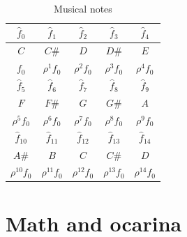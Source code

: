 \documentclass[11pt,twocolumn]{article}
\begin{document}
\begin{table}[h]
\center
{\renewcommand{\arraystretch}{1.2}
\begin{tabular}{|c|c|c|c|c|}
\hline
$\hat{f}_{0}$ & $\hat{f}_{1}$    & $\hat{f}_{2}$    & $\hat{f}_{3}$    & $\hat{f}_{4}$    \\ \hline
$C$           & $C\#$            & $D$              & $D\#$            & $E$              \\ \hline
$f_{0}$       & ${\rho}^1 f_{0}$ & ${\rho}^2 f_{0}$ & ${\rho}^3 f_{0}$ & ${\rho}^4 f_{0}$ \\ \hline
\hline
$\hat{f}_{5}$    & $\hat{f}_{6}$    & $\hat{f}_{7}$    & $\hat{f}_{8}$    & $\hat{f}_{9}$    \\ \hline
$F$              & $F\#$            & $G$              & $G\#$            & $A$              \\ \hline
${\rho}^5 f_{0}$ & ${\rho}^6 f_{0}$ & ${\rho}^7 f_{0}$ & ${\rho}^8 f_{0}$ & ${\rho}^9 f_{0}$ \\ \hline
\hline 
$\hat{f}_{10}$      & $\hat{f}_{11}$      & $\hat{f}_{12}$      & $\hat{f}_{13}$      & $\hat{f}_{14}$      \\ \hline
$A\#$               & $B$                 & $C$                 & $C\#$               & $D$                 \\ \hline
${\rho}^{10} f_{0}$ & ${\rho}^{11} f_{0}$ & ${\rho}^{12} f_{0}$ & ${\rho}^{13} f_{0}$ & ${\rho}^{14} f_{0}$ \\ \hline
\end{tabular}
}
\vspace{5pt}
\caption{Musical notes}
\label{tab:notes}
\end{table}


\section{Math and ocarina}
\end{document}
